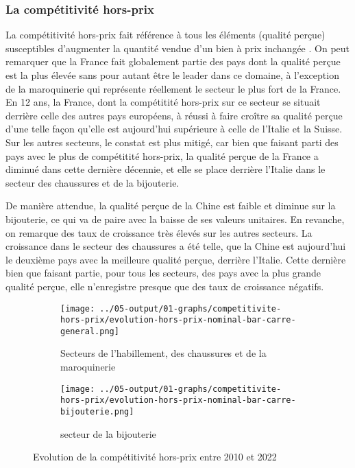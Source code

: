 \documentclass[french,10pt,a4paper]{article}
\begin{document}
\subsubsection{La compétitivité hors-prix}
La compétitivité hors-prix fait référence à tous les éléments (qualité perçue) susceptibles d'augmenter la quantité vendue d'un bien à prix inchangée \citep{Khandelwal2013}. On peut remarquer que la France fait globalement partie des pays dont la qualité perçue est la plus élevée sans pour autant être le leader dans ce domaine, à l'exception de la maroquinerie qui représente réellement le secteur le plus fort de la France. En 12 ans, la France, dont la compétitité hors-prix sur ce secteur se situait derrière celle des autres pays européens, à réussi à faire croître sa qualité perçue d'une telle façon qu'elle est aujourd'hui supérieure à celle de l'Italie et la Suisse. Sur les autres secteurs, le constat est plus mitigé, car bien que faisant parti des pays avec le plus de compétitité hors-prix, la qualité perçue de la France a diminué dans cette dernière décennie, et elle se place derrière l'Italie dans le secteur des chaussures et de la bijouterie.

De manière attendue, la qualité perçue de la Chine est faible et diminue sur la bijouterie, ce qui va de paire avec la baisse de ses valeurs unitaires. En revanche, on remarque des taux de croissance très élevés sur les autres secteurs. La croissance dans le secteur des chaussures a été telle, que la Chine est aujourd'hui le deuxième pays avec la meilleure qualité perçue, derrière l'Italie. Cette dernière bien que faisant partie, pour tous les secteurs, des pays avec la plus grande qualité perçue, elle n'enregistre presque que des taux de croissance négatifs. 


\begin{figure}[!h]
  \centering
  \begin{subfigure}{\textwidth}
    \centering    \texttt{[image: ../05-output/01-graphs/competitivite-hors-prix/evolution-hors-prix-nominal-bar-carre-general.png]}
    \caption{Secteurs de l'habillement, des chaussures et de la maroquinerie}
    \label{fig:evolution-hors-prix-nominal-bar-carre-general}
  \end{subfigure}
  \vspace{0.5cm}
  \begin{subfigure}{\textwidth}
    \centering \texttt{[image: ../05-output/01-graphs/competitivite-hors-prix/evolution-hors-prix-nominal-bar-carre-bijouterie.png]}
 \caption{secteur de la bijouterie}
 \label{fig:evolution-hors-prix-nominal-bar-carre-bijouterie.png}
  \end{subfigure}
  \caption{Evolution de la compétitivité hors-prix entre 2010 et 2022}
  \label{fig:hors-prix}
\end{figure}
\end{document}
